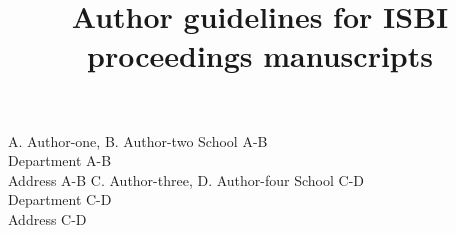 \title{Author guidelines for ISBI proceedings manuscripts}
%


\twoauthors
  {A. Author-one, B. Author-two}
	{School A-B\\
	Department A-B\\
	Address A-B}
  {C. Author-three, D. Author-four}
	{School C-D\\
	Department C-D\\
	Address C-D}


 \address{
     $^{\star}$ Affiliation Number One \\
     $^{\dagger}$ Affiliation Number Two
}
